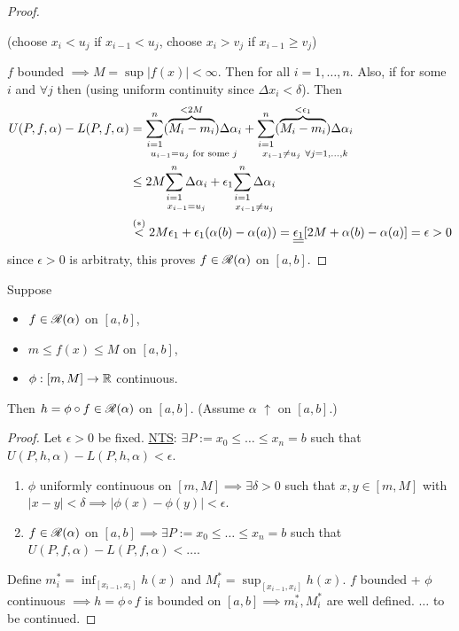 \documentclass[]{article}
\begin{document}
\begin{proof}
\begin{itemize}
			(choose $x_i<u_j$ if $x_{i-1} < u_j$,
			choose $x_i>v_j$ if $x_{i-1}\geq v_j$)
	\end{itemize}
	$f$ bounded $\implies M=\sup|f(x)|<\infty$.
	Then  for all $i=1,\dots,n$.
	Also, if  for some $i$ and $\forall j$ then  (using uniform continuity since $\Delta x_i<\delta$).
	Then 
	\begin{align*}
		U(P,f,\alpha)-L(P,f,\alpha)
		&= \us{u_{i-1}=u_j\text{ for some }j}{\sum_{i=1}^n (\ob{<2M}{M_i-m_i})\Delta\alpha_i} + \us{x_{i-1}\neq u_j\ \forall j=1,\dots,k}{\sum_{i=1}^n (\ob{<\epsilon_1}{M_i-m_i})\Delta\alpha_i} \\
		&\leq 2M \us{x_{i-1}=u_j}{\sum_{i=1}^n\Delta\alpha_i} + \epsilon_1 \us{x_{i-1}\neq u_j}{\sum_{i=1}^n\Delta\alpha_i} \\
		&\os{(*)}< 2M\epsilon_1 + \epsilon_1(\alpha(b)-\alpha(a))
		= \ul{\ul{\epsilon_1}}[2M+\alpha(b)-\alpha(a)]=\epsilon>0
	\end{align*}
	since $\epsilon>0$ is arbitraty, this proves $f\in\ms R(\alpha)$ on $[a,b]$.
\end{proof}

\begin{theorem}
	Suppose
	\begin{itemize}
		\item $f\in\ms R(\alpha)$ on $[a,b]$,
		\item $m\leq f(x)\leq M$ on $[a,b]$,
		\item $\phi:[m,M]\ra\mb R$ continuous.
	\end{itemize}
	Then $h = \phi\circ f\in\ms R(\alpha)$ on $[a,b]$.
	(Assume $\alpha$ $\uparrow$ on $[a,b]$.)
\end{theorem}
\begin{proof}
	Let $\epsilon>0$ be fixed.
	\ul{NTS}: $\exists P:=x_0\leq \dots\leq x_n=b$ such that $U(P,h,\alpha)-L(P,h,\alpha) < \epsilon$.
	\begin{enumerate}
		\item $\phi$ uniformly continuous on $[m,M] \implies \exists\delta >0$ such that $x,y\in[m,M]$ with $|x-y|<\delta \implies |\phi(x)-\phi(y)|<\epsilon$.
		\item $f\in\ms R(\alpha)$ on $[a,b] \implies \exists P:=x_0\leq\dots\leq x_n=b$ such that $U(P,f,\alpha) - L(P,f,\alpha) < \dots$.
	\end{enumerate}
	Define $m_i^* = \inf_{[x_{i-1},x_i]} h(x)$ and $M_i^* = \sup_{[x_{i-1},x_i]} h(x)$.
	$f$ bounded + $\phi$ continuous $\implies h=\phi\circ f$ is bounded on $[a,b] \implies m_i^*,M_i^*$ are well defined. $\dots$ to be continued.
\end{proof}
\end{document}
